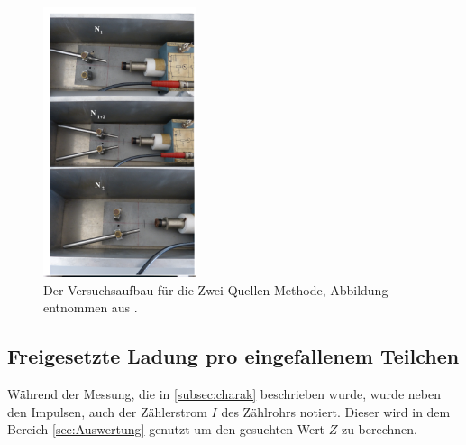 \begin{figure}
    \centering
    \includegraphics[width=0.4\textwidth]{content/data/aufbau.png}
    \caption{Der Versuchsaufbau für die Zwei-Quellen-Methode, Abbildung entnommen aus \cite{anleitung}.}
    \label{fig:aufbau}
\end{figure}
\FloatBarrier
\subsection{Freigesetzte Ladung pro eingefallenem Teilchen}
Während der Messung, die in \ref{subsec:charak} beschrieben wurde, wurde neben den Impulsen, auch der Zählerstrom $I$ des Zählrohrs notiert.
Dieser wird in dem Bereich \ref{sec:Auswertung} genutzt um den gesuchten Wert $Z$ zu berechnen.